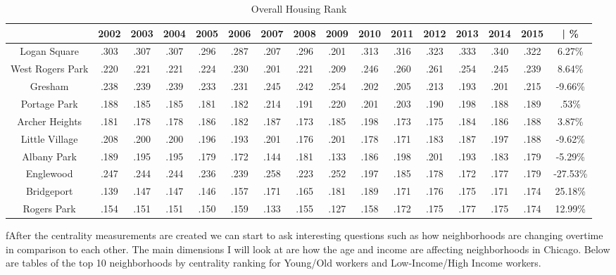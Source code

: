 \documentclass{article}
\theoremstyle{definition}
\theoremstyle{remark}
\begin{document}
\begin{table}[h]\centering
\caption{Overall Housing Rank}\label{thelabel}

\begin{adjustbox}{center}
\begin{tabular}{||c | c c c c c c c c c c c c c c | c ||} 
 \hline
 & 2002 & 2003 & 2004 & 2005 & 2006 & 2007 & 2008 & 2009 & 2010 & 2011 & 2012 & 2013 & 2014 & 2015 & | \%\\[0.5ex] 
 \hline\hline
Logan Square & .303 & .307 & .307 & .296 & .287 & .207 & .296 & .201 & .313 & .316 & .323 & .333 & .340 & .322 & 6.27\% \\
West Rogers Park & .220 & .221 & .221 & .224 & .230 & .201 & .221 & .209 & .246 & .260 & .261 & .254 & .245 & .239 & 8.64\% \\
Gresham & .238 & .239 & .239 & .233 & .231 & .245 & .242 & .254 & .202 & .205 & .213 & .193 & .201 & .215 & -9.66\% \\
Portage Park & .188 & .185 & .185 & .181 & .182 & .214 & .191 & .220 & .201 & .203 & .190 & .198 & .188 & .189 & .53\% \\
Archer Heights & .181 & .178 & .178 & .186 & .182 & .187 & .173 & .185 & .198 & .173 & .175 & .184 & .186 & .188 & 3.87\% \\
Little Village & .208 & .200 & .200 & .196 & .193 & .201 & .176 & .201 & .178 & .171 & .183 & .187 & .197 & .188 & -9.62\% \\
Albany Park & .189 & .195 & .195 & .179 & .172 & .144 & .181 & .133 & .186 & .198 & .201 & .193 & .183 & .179 & -5.29\% \\
Englewood & .247 & .244 & .244 & .236 & .239 & .258 & .223 & .252 & .197 & .185 & .178 & .172 & .177 & .179 & -27.53\% \\
Bridgeport & .139 & .147 & .147 & .146 & .157 & .171 & .165 & .181 & .189 & .171 & .176 & .175 & .171 & .174 & 25.18\% \\
Rogers Park & .154 & .151 & .151 & .150 & .159 & .133 & .155 & .127 & .158 & .172 & .175 & .177 & .175 & .174 & 12.99\% \\ \hline
 \end{tabular}
\end{adjustbox}
\end{table}


fAfter the centrality measurements are created we can start to ask interesting questions such as how neighborhoods are changing overtime in comparison to each other.  The main dimensions I will look at are how the age and income are affecting neighborhoods in Chicago.  Below are tables of the top 10 neighborhoods by centrality ranking for Young/Old workers and Low-Income/High Income workers.\\
\end{document}

